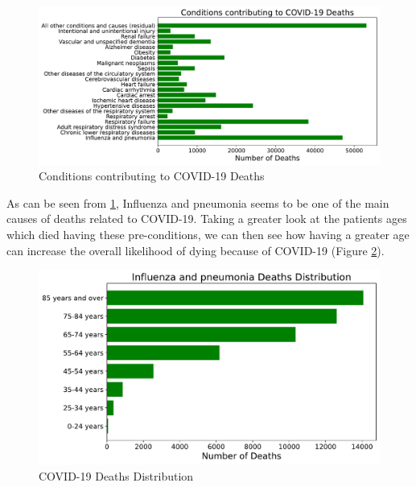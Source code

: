 \begin{figure}[ht!]%
    \centering
    \includegraphics[width=0.85\linewidth]{latex/images/deaths_conditions.pdf}
    \vspace{-0.2cm}
    \caption{Conditions contributing to COVID-19 Deaths}
    \label{d_cond}
\end{figure}

As can be seen from \ref{d_cond}, Influenza and pneumonia seems to be one of the main causes of deaths related to COVID-19. Taking a greater look at the patients ages which died having these pre-conditions, we can then see how having a greater age can increase the overall likelihood of dying because of COVID-19 (Figure \ref{d_top}).

\begin{figure}[ht!]%
    \centering
    \includegraphics[width=0.65\linewidth]{latex/images/deaths_top.pdf}
    \vspace{-0.2cm}
    \caption{COVID-19 Deaths Distribution}
    \label{d_top}
\end{figure}